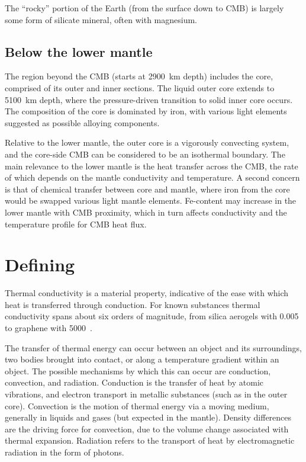 The ``rocky'' portion of the Earth (from the surface down to CMB) is largely some form of silicate mineral, often with magnesium.


\subsection{Below the lower mantle}

The region beyond the CMB (starts at 2900~km depth) includes the core, comprised of its outer and inner sections. The liquid outer core extends to 5100~km depth, where the pressure-driven transition to solid inner core occurs. The composition of the core is dominated by iron, with various light elements suggested as possible alloying components.

Relative to the lower mantle, the outer core is a vigorously convecting system, and the core-side CMB can be considered to be an isothermal boundary. The main relevance to the lower mantle is the heat transfer across the CMB, the rate of which depends on the mantle conductivity and temperature. A second concern is that of chemical transfer between core and mantle, where iron from the core would be swapped various light mantle elements. Fe-content may increase in the lower mantle with CMB proximity, which in turn affects conductivity and the temperature profile for CMB heat flux.



\section{Defining \tc}
\label{sec:defining_tc}

Thermal conductivity is a material property, indicative of the ease with which heat is transferred through conduction. For known substances thermal conductivity spans about six orders of magnitude, from silica aerogels with 0.005~\wmks \citep{Lee1995} to graphene with 5000~\wmks \citep{Balandin2008}.

The transfer of thermal energy can occur between an object and its surroundings, two bodies brought into contact, or along a temperature gradient within an object. The possible mechanisms by which this can occur are conduction, convection, and radiation. Conduction is the transfer of heat by atomic vibrations, and electron transport in metallic substances (such as in the outer core). Convection is the motion of thermal energy via a moving medium, generally in liquids and gases (but expected in the mantle). Density differences are the driving force for convection, due to the volume change associated with thermal expansion. Radiation refers to the transport of heat by electromagnetic radiation in the form of photons.

